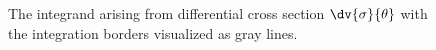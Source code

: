 \begin{figure}[ht]
  \centering
    \caption[\(2\pi\dv{\sigma}{\theta}\) with integration
    boundaries]{\label{fig:xs-int-theta} The integrand arising from
      differential cross section \(\dv{\sigma}{\theta}\) with the
      integration borders visualized as gray lines.}
\end{figure}
